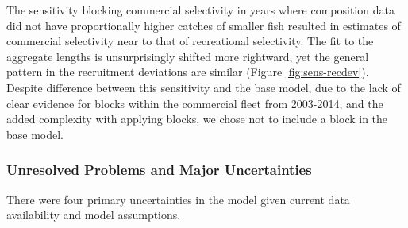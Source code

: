 \documentclass[11pt,
  english,
  a4paper,
]{article}
\begin{document}
\leavevmode\tagmcend\tagstructend\par


The sensitivity blocking commercial selectivity in years where composition data did not have proportionally higher catches of smaller fish resulted in estimates of commercial selectivity near to that of recreational selectivity. The fit to the aggregate lengths is unsurprisingly shifted more rightward, yet the general pattern in the recruitment deviations are similar (Figure \ref{fig:sens-recdev}). Despite difference between this sensitivity and the base model, due to the lack of clear evidence for blocks within the commercial fleet from 2003-2014, and the added complexity with applying blocks, we chose not to include a block in the base model.

\leavevmode\tagmcend\tagstructend\par


\hypertarget{unresolved-problems-and-major-uncertainties}{%
\subsubsection{Unresolved Problems and Major Uncertainties}\label{unresolved-problems-and-major-uncertainties}}

\leavevmode\tagmcend\tagstructend


There were four primary uncertainties in the model given current data availability and model assumptions.

\leavevmode\tagmcend\tagstructend\par

\end{document}
